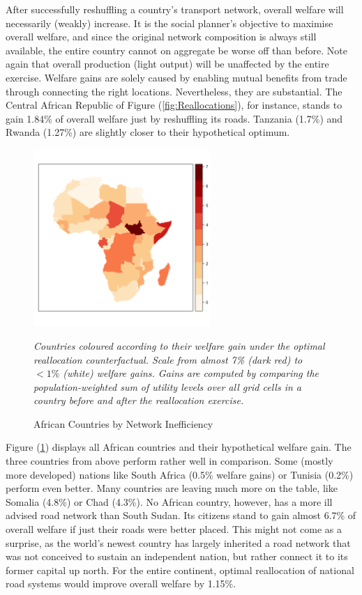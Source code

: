 \documentclass[11pt, oneside]{article}   	%
\let\oldref\ref
\renewcommand{\ref}[1]{(\oldref{#1})}
\newcommand{\mysubcaption}[1]{
\justify
\begin{spacing}{0.7}
\textit{\footnotesize #1}
\end{spacing}}
\begin{document}
After successfully reshuffling a country's transport network, overall welfare will necessarily (weakly) increase. It is the social planner's objective to maximise overall welfare, and since the original network composition is always still available, the entire country cannot on aggregate be worse off than before. Note again that overall production (light output) will be unaffected by the entire exercise. Welfare gains are solely caused by enabling mutual benefits from trade through connecting the right locations. Nevertheless, they are substantial. The Central African Republic of Figure \ref{fig:Reallocations}, for instance, stands to gain 1.84\% of overall welfare just by reshuffling its roads. Tanzania (1.7\%) and Rwanda (1.27\%) are slightly closer to their hypothetical optimum.

\begin{figure}
\centering
\caption{African Countries by Network Inefficiency}
\includegraphics[width=0.6\textwidth,trim={1cm 4cm 1cm 3cm},clip]{../../Analysis/output/zeta_heatmaps/African_countries_zeta.png}

\label{fig:countries_by_welfare_gain}
\mysubcaption{Countries coloured according to their welfare gain under the optimal reallocation counterfactual. Scale from almost 7\% (dark red) to $<1\%$ (white) welfare gains. Gains are computed by comparing the population-weighted sum of utility levels over all grid cells in a country before and after the reallocation exercise.}
\end{figure}

Figure \ref{fig:countries_by_welfare_gain} displays all African countries and their hypothetical welfare gain. The three countries from above perform rather well in comparison. Some (mostly more developed) nations like South Africa (0.5\% welfare gains) or Tunisia (0.2\%) perform even better. Many countries are leaving much more on the table, like Somalia (4.8\%) or Chad (4.3\%). No African country, however, has a more ill advised road network than South Sudan. Its citizens stand to gain almost 6.7\% of overall welfare if just their roads were better placed. This might not come as a surprise, as the world's newest country has largely inherited a road network that was not conceived to sustain an independent nation, but rather connect it to its former capital up north. For the entire continent, optimal reallocation of national road systems would improve overall welfare by 1.15\%.
\end{document}
